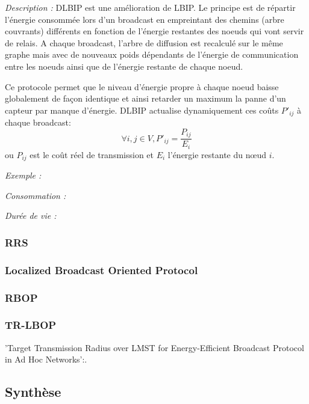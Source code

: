 \emph{Description :} DLBIP est une amélioration de LBIP. Le principe est de répartir l'énergie consommée lors d'un broadcast en empreintant des chemins (arbre couvrants) différents en fonction de l'énergie restantes des noeuds qui vont servir de relais. A chaque broadcast, l'arbre de diffusion est recalculé sur le même graphe mais avec de nouveaux poids dépendants de l'énergie de communication entre les noeuds ainsi que de l'énergie restante de chaque noeud.

Ce protocole permet que le niveau d'énergie propre à chaque noeud baisse globalement de façon identique et ainsi retarder un maximum la panne d'un capteur par manque d'énergie.
DLBIP actualise dynamiquement ces coûts $P'_{ij}$ à chaque broadcast:
$$ \forall i,j \in V, P'_{ij}=\frac{P_{ij}}{E_i}$$
ou $P_{ij}$ est le coût réel de transmission et $E_i$ l'énergie restante du nœud $i$.


\emph{Exemple :} 

\emph{Consommation :} 

\emph{Durée de vie :} 



\subsubsection{RRS \cite{Cartigny2003RNG}}


\subsubsection{Localized Broadcast Oriented Protocol \cite{Cartigny2005}}


\subsubsection{RBOP \cite{Cartigny2005}}


\subsubsection{TR-LBOP \cite{Ingelrest2004}}
'Target Transmission Radius over LMST for Energy-Efficient Broadcast Protocol in Ad Hoc Networks':.\\








\subsection{Synthèse}

